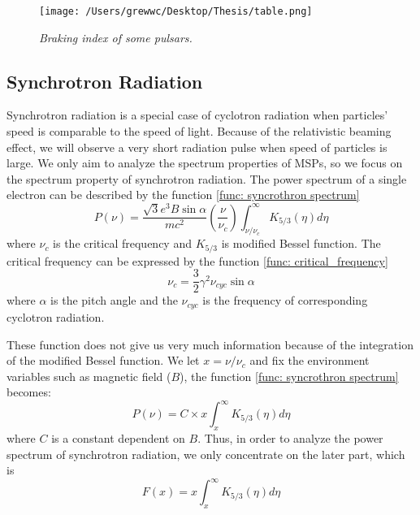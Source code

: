 \documentclass[12pt]{report}
\newcommand{\mycaption}[1]{\caption{\textit{\footnotesize #1}}}
\begin{document}
            \begin{figure}[!ht]
              \centering
              \texttt{[image: /Users/grewwc/Desktop/Thesis/table.png]}
              \mycaption{Braking index of some pulsars.}
              \label{fig:braking_index}
            \end{figure}
    
        \subsection{Synchrotron Radiation}
              Synchrotron radiation is a special case of cyclotron radiation when particles' speed is comparable to the 
              speed of light. Because of the relativistic beaming effect, we will observe a very short radiation pulse 
              when speed of particles is large. 
              We only aim to analyze the spectrum properties of MSPs, so we focus on the 
              spectrum property of synchrotron radiation. The power spectrum of a single electron  
              can be described by the function \ref{func: syncrothron spectrum}
            \begin{equation}
              \label{func: syncrothron spectrum}
              P\left(\nu\right) = \frac{\sqrt{3} e^3 B \sin{\alpha}}{m c^2} 
                \left(\frac{\nu}{\nu_c}\right) \int_{\nu / \nu_c}^{\infty} K_{5/3}\left(\eta \right)d\eta 
            \end{equation}
            where $\nu_c$ is the critical frequency and $K_{5/3}$ is modified Bessel function. The critical frequency 
            can be expressed by the function \ref{func: critical_frequency}
            \begin{equation}
              \label{func: critical_frequency}
              \nu_c = \frac{3}{2} \gamma^2 \nu_{cyc} \sin{\alpha}
            \end{equation} 
            where $\alpha$ is the pitch angle and the $\nu_{cyc}$ is the frequency of corresponding cyclotron radiation. 
  
            These function does not give us very much information because of the integration of the modified Bessel 
            function. We let $x = \nu / \nu_c$ and fix the environment variables such as magnetic field ($B$), 
            the function \ref{func: syncrothron spectrum} becomes: 
            \begin{equation}
              \label{func: to_x}
              P\left(\nu\right) = C \times x \int_{x}^{\infty} K_{5/3}\left(\eta \right)d\eta 
            \end{equation}
            where $C$ is a constant dependent on $B$. Thus, in order to analyze the power spectrum of synchrotron radiation,
            we only concentrate on the later part, which is
            \begin{equation}
              \label{func: fx}
              F\left(x\right) = x \int_{x}^{\infty} K_{5/3}\left(\eta \right)d\eta 
            \end{equation}
            
\end{document}

